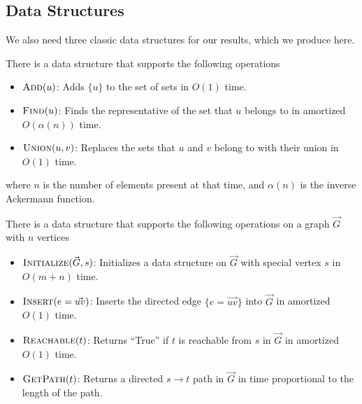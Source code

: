 \documentclass[11pt,a4paper]{article}
\newcommand{\fn}[1]{\textup{\textsc{#1}}}
\begin{document}
\subsection{Data Structures}
\label{sec:datastructures}

We also need three classic data structures for our results, which we produce here.


\begin{fact}
\label{def:unionfind}
There is a data structure that supports the following operations
\begin{itemize}
    \item $\fn{Add}(u)$: Adds $\{u\}$ to the set of sets in $O(1)$ time.
    \item $\fn{Find}(u)$: Finds the representative of the set that $u$ belongs to in amortized $O(\alpha(n))$ time.
    \item $\fn{Union}(u, v)$: Replaces the sets that $u$ and $v$ belong to with their union in $O(1)$ time.
\end{itemize}
where $n$ is the number of elements present at that time, and $\alpha(n)$ is the inverse Ackermann function.
\end{fact}

\begin{fact}
\label{def:SSR}
There is a data structure that supports the following operations on a graph $\vec{G}$ with $n$ vertices
\begin{itemize}
    \item $\fn{Initialize}(\vec{G}, s)$: Initializes a data structure on $\vec{G}$ with special vertex $s$ in $O(m+n)$ time.
    \item $\fn{Insert}(e = \vec{uv})$: Inserts the directed edge $\{e = \vec{uv}\}$ into $\vec{G}$ in amortized $O(1)$ time.
    \item $\fn{Reachable}(t)$: Returns ``True'' if $t$ is reachable from $s$ in $\vec{G}$ in amortized $O(1)$ time.
    \item $\fn{GetPath}(t)$: Returns a directed $s \to t$ path in $\vec{G}$ in time proportional to the length of the path.
\end{itemize}
\end{fact}
\end{document}
